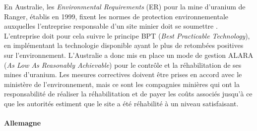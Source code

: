 \documentclass{article}
\begin{document}
En Australie, les \textit{Environmental Requirements} (ER) pour la mine d’uranium de Ranger, établis en 1999, fixent les normes de protection environnementale auxquelles l’entreprise responsable d’un site minier doit se soumettre \cite{noauthor_department_nodate}.
L’entreprise doit pour cela suivre le principe BPT (\textit{Best Practicable Technology}), en implémentant la technologie disponible ayant le plus de retombées positives sur l’environnement. L’Australie a donc mis en place un mode de gestion ALARA (\textit{As Low As Reasonably Achievable}) pour le contrôle et la réhabilitation de ses mines d’uranium.
Les mesures correctives doivent être prises en accord avec le ministère de l’environnement, mais ce sont les compagnies minières qui ont la responsabilité de réaliser la réhabilitation et de payer les coûts associés jusqu’à ce que les autorités estiment que le site a été réhabilité à un niveau satisfaisant.

\paragraph{Allemagne \\ \\}
\end{document}
